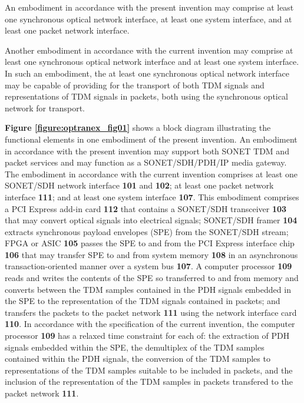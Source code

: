 \documentclass[letterpaper,final,notitlepage,twocolumn,10pt,twoside]{article}
\begin{document}
An embodiment in accordance with the present invention may comprise at least
one synchronous optical network interface, at least one system interface, and
at least one packet network interface.

Another embodiment in accordance with the current invention may comprise at
least one synchronous optical network interface and at least one system
interface.  In such an embodiment, the at least one synchronous optical
network interface may be capable of providing for the transport of both TDM
signals and representations of TDM signals in packets, both using the
synchronous optical network for transport.



\textbf{Figure \ref{figure:optranex_fig01}} shows a block diagram illustrating
the functional elements in one embodiment of the present invention.  An
embodiment in accordance with the present invention may support both SONET TDM
and packet services and may function as a SONET/SDH/PDH/IP media gateway.  The
embodiment in accordance with the current invention comprises at least one
SONET/SDH network interface \textbf{101} and \textbf{102}; at least one packet
network interface \textbf{111}; and at least one system interface
\textbf{107}.  This embodiment comprises a PCI Express add-in card
\textbf{112} that contains a SONET/SDH transceiver \textbf{103} that may
convert optical signals into electrical signals; SONET/SDH framer \textbf{104}
extracts synchronous payload envelopes (SPE) from the SONET/SDH stream; FPGA
or ASIC \textbf{105} passes the SPE to and from the PCI Express interface chip
\textbf{106} that may transfer SPE to and from system memory \textbf{108} in
an asynchronous transaction-oriented manner over a system bus \textbf{107}.  A
computer processor \textbf{109} reads and writes the contents of the SPE so
transferred to and from memory and converts between the TDM samples contained
in the PDH signals embedded in the SPE to the representation of the TDM
signals contained in packets; and transfers the packets to the packet network
\textbf{111} using the network interface card \textbf{110}.  In accordance
with the specification of the current invention, the computer processor
\textbf{109} has a relaxed time constraint for each of: the extraction of PDH
signals embedded within the SPE, the demultiplex of the TDM samples
contained within the PDH signals, the conversion of the TDM samples to
representations of the TDM samples suitable to be included in packets, and the
inclusion of the representation of the TDM samples in packets transfered to
the packet network \textbf{111}.
\end{document}
